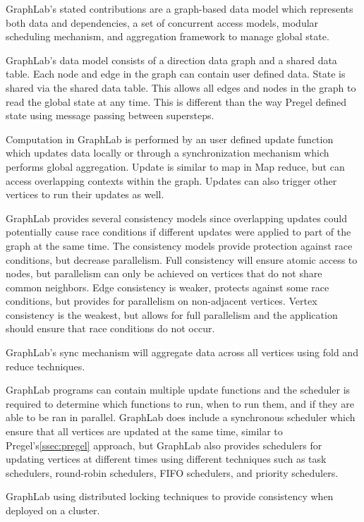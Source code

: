 \documentclass[]{article}
\begin{document}
GraphLab's stated contributions are a graph-based data model which represents both data and dependencies, a set of concurrent access models, modular scheduling mechanism, and aggregation framework to manage global state.

GraphLab's data model consists of a direction data graph and a shared data table. Each node and edge in the graph can contain user defined data. State is shared via the shared data table. This allows all edges and nodes in the graph to read the global state at any time. This is different than the way Pregel defined state using message passing between supersteps.

Computation in GraphLab is performed by an user defined update function which updates data locally or through a synchronization mechanism which performs global aggregation. Update is similar to map in Map reduce, but can access overlapping contexts within the graph. Updates can also trigger other vertices to run their updates as well. 

GraphLab provides several consistency models since overlapping updates could potentially cause race conditions if different updates were applied to part of the graph at the same time. The consistency models provide protection against race conditions, but decrease parallelism. Full consistency will ensure atomic access to nodes, but parallelism can only be achieved on vertices that do not share common neighbors. Edge consistency is weaker, protects against some race conditions, but provides for parallelism on non-adjacent vertices. Vertex consistency is the weakest, but allows for full parallelism and the application should ensure that race conditions do not occur.

GraphLab's sync mechanism will aggregate data across all vertices using fold and reduce techniques. 

GraphLab programs can contain multiple update functions and the scheduler is required to determine which functions to run, when to run them, and if they are able to be ran in parallel. GraphLab does include a synchronous scheduler which ensure that all vertices are updated at the same time, similar to Pregel's\ref{ssec:pregel} approach, but GraphLab also provides schedulers for updating vertices at different times using different techniques such as task schedulers, round-robin schedulers, FIFO schedulers, and priority schedulers.

GraphLab using distributed locking techniques to provide consistency when deployed on a cluster.
\end{document}
